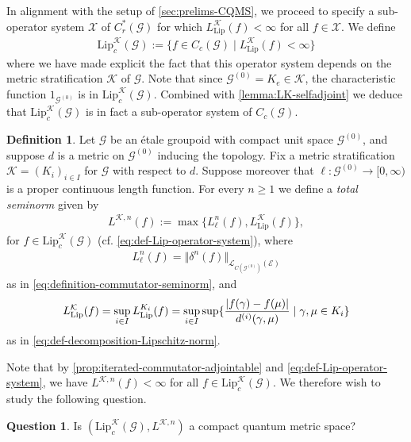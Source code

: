 \documentclass[11pt,a4paper,oneside,final,reqno]{amsart}
\theoremstyle{definition}
\newtheorem{definition}[lemma]{Definition}
\newtheorem{question}[lemma]{Question}
\newcommand{\G}{\mathcal{G}}
\newcommand{\Go}{\mathcal{G}^{(0)}}
\newcommand{\cK}{\mathcal{K}}
\newcommand{\cX}{\mathcal{X}}
\newcommand{\cE}{\mathcal{E}}
\newcommand{\Lip}{\mathrm{Lip}}
\newcommand{\Cred}{C_{r}^{*}}
\numberwithin{equation}{section}
\begin{document}
	In alignment with the setup of \cref{sec:prelims-CQMS}, we proceed to specify a  sub-operator system $\cX$ of $\Cred(\G)$ for which  $L^{\cK}_{\mathrm{Lip}}(f) < \infty$ for all $f \in \cX$. We define
	\begin{align}\label{eq:def-Lip-operator-system}
	\Lip_c^{\cK}(\G) := \{ f \in C_c (\G) \mid L^{\cK}_{\mathrm{Lip}}(f) < \infty  \}
	\end{align}
	where we have made explicit the fact that this operator system depends on the metric stratification $\cK$ of $\G$. Note that since $\Go = K_e \in \cK$, the characteristic function $1_{\Go}$ is in 
	$\Lip_c^{\cK}(\G)$. 
	Combined with \cref{lemma:LK-selfadjoint} we deduce that 
	$\Lip_c^{\cK}(\G)$
	is in fact a sub-operator system of $C_c(\G)$. 
	
	\begin{definition}\label{def:total-seminorm}
		Let $\G$ be an \'etale groupoid with compact unit space $\Go$, 
		and suppose $d$ is a metric on $\Go$ inducing the topology.
		Fix a metric stratification $\cK = (K_i)_{i\in I}$ for $\G$ with respect to $d$. 
		Suppose moreover that $\ell \colon \Go \to [0,\infty)$ is a proper continuous length function.  For every $n \geq 1$ we define a \emph{total seminorm} given by
			\begin{align}\label{eq:def-total-seminorm}
			L^{\cK, n} (f) := \max \{ L^n_\ell(f) , L_{\mathrm{Lip}}^{\cK} (f)  \},
		\end{align}
		for 
		$ f \in \Lip_c^{\cK}(\G)$ 
		(cf. \eqref{eq:def-Lip-operator-system}), where 
		\begin{align*}
			L^{n}_\ell(f) = \Vert \delta^n (f) \Vert_{\mathcal{L}_{C(\Go)}(\cE)}
		\end{align*} 
		as in \eqref{eq:definition-commutator-seminorm}, and
		\begin{align*}
			L^{\cK}_{\rm Lip}(f) = \sup_{i \in I}   L^{K_i}_{\mathrm{Lip}}(f) = \sup_{i \in I} \sup \{ \frac{\vert f(\gamma) - f(\mu) \vert}{d^{(i)}(\gamma, \mu)} \mid \gamma,\mu \in K_i   \}
		\end{align*}
		as in \eqref{eq:def-decomposition-Lipschitz-norm}.
	\end{definition}
	

	Note that by \cref{prop:iterated-commutator-adjointable} and \eqref{eq:def-Lip-operator-system}, we have $L^{\cK, n}(f) < \infty$ for all 
	$f \in \Lip_c^{\cK}(\G)$. 
	We therefore wish to study the following question.
	\begin{question}\label{question:when-do-we-get-cmqs}
		Is 
		$(\Lip_c^{\cK}(\G), L^{\cK, n})$
		a compact quantum metric space?
	\end{question}
	
\end{document}
